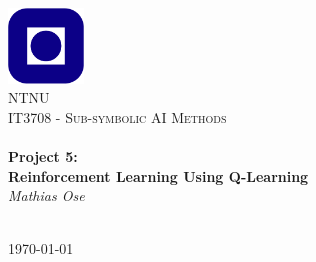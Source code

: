 \begin{titlepage}
\begin{center}
\includegraphics[width=0.15\textwidth]{img/NTNU.png}~\\[1cm]

\textsc{\LARGE NTNU}\\[1.5cm]

\textsc{\Large IT3708 - Sub-symbolic AI Methods}\\[0.5cm]

\HRule \\[0.4cm]
{\huge \bfseries Project 5: \\ Reinforcement Learning Using Q-Learning}\\[0.5cm]
{\large \textit{Mathias Ose}}\\[0.2cm]
\HRule \\[1.5cm]



\vfill

{\large \today}
\end{center}
\end{titlepage}
